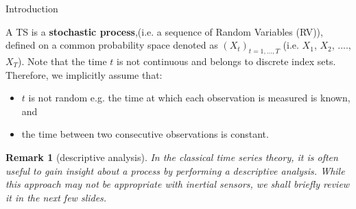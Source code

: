 \documentclass[envcountsect,usenames,dvipsnames]{beamer}
\theoremstyle{mystyle}
\newtheorem{Remark}{Remark}
\begin{document}


\begin{frame}{Introduction}

	\begin{definition}
	\label{def:time:series}
		A TS is a {\color{beamer@UIUCblue}\textbf{stochastic process}},(i.e. a sequence of Random Variables (RV)),  defined on a common probability space denoted as $(X_t)_{t = 1,...,T}$ (i.e. $X_1$, $X_2$, ...., $X_T$). Note that the time $t$ is not continuous and belongs to discrete index sets. Therefore, we implicitly assume that:
	\begin{itemize}
		\item $t$ is not random e.g. the time at which each observation is measured is known, and
		\item the time between two consecutive observations is constant.
	\end{itemize}
\end{definition}
	
\begin{Remark}[descriptive analysis]
In the classical time series theory, it is often useful to gain insight about a process by performing a descriptive analysis. While this approach may not be appropriate with inertial sensors, we shall briefly review it in the next few slides. 
\end{Remark}	

\end{frame}
\end{document}
